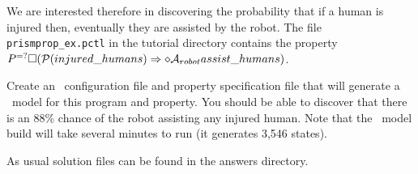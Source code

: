\begin{sloppypar}
We are interested therefore in discovering the probability that if a human is injured then, eventually they are assisted by the robot.  The file \texttt{prismprop\_ex.pctl} in the tutorial directory contains the property $P^{=?}\Box (\mathrm{{\cal P}}(injured\_humans) \Rightarrow  \diamond \mathrm{{\cal A}}_{robot} assist\_humans)$.  
\end{sloppypar}

Create an \ajpf\ configuration file and property specification file that will generate a \prism\ model for this program and property.  You should be able to discover that there is an 88\% chance of the robot assisting any injured human.  Note that the \ajpf\ model build will take several minutes to run (it generates 3,546 states).

As usual solution files can be found in the answers directory.


